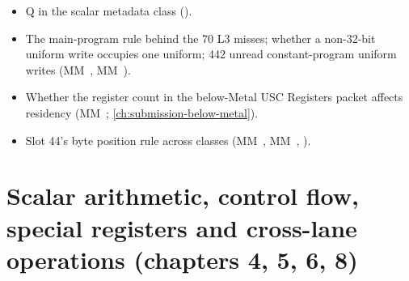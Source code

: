 \begin{itemize}
\item Q in the scalar metadata class ().
\item The main-program rule behind the 70 L3 misses; whether a non-32-bit uniform write occupies one uniform; 442 unread
  constant-program uniform writes (MM~, MM~).
\item Whether the register count in the below-Metal USC Registers packet affects residency (MM~; \cref{ch:submission-below-metal}).
\item Slot 44's byte position rule across classes (MM~, MM~, ).
\end{itemize}

\section{Scalar arithmetic, control flow, special registers and cross-lane
operations (chapters 4, 5, 6, 8)}\label{sec:scalar-arithmetic-control}


